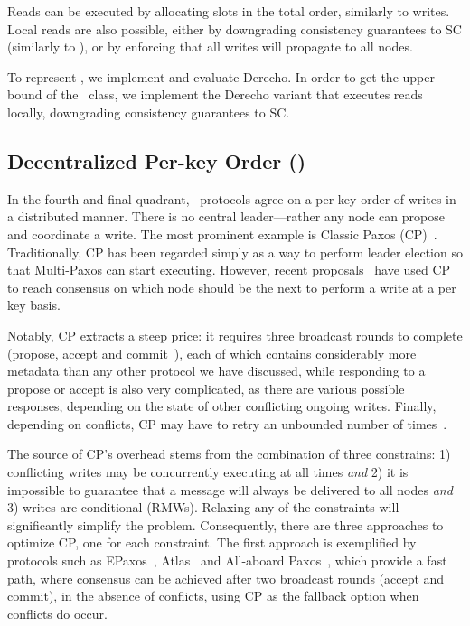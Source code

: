 Reads can be executed 
by allocating slots in the total order, similarly to writes.
Local reads are also possible, either by downgrading consistency guarantees to SC (similarly to \LTO), or by enforcing that all writes will propagate to all nodes.

To represent \DTO, we implement and evaluate Derecho. In order to get the upper bound of the \DTO~class, we implement the Derecho variant that executes reads locally, downgrading consistency guarantees to SC.

\subsection{Decentralized Per-key Order (\DPKO)}\label{sec:tax:dpko}
In the fourth and final quadrant, \DPKO~protocols %
agree on a per-key order of writes in a distributed manner. There is no central leader---rather any node can propose and coordinate a write. 
The most prominent example is Classic Paxos (CP)~\cite{Lamport:1998}.
Traditionally, CP has been regarded simply as a way to perform leader election so that Multi-Paxos can start executing.
However, recent proposals~\cite{Skrzypczak:2020, Rystsov:2018, V:2020}
have used CP to reach consensus on which node should be the next to perform a write at a per key basis.



Notably, CP extracts a steep price: it requires three broadcast rounds to complete (propose, accept and commit~\cite{Howard:2019}), each of which contains considerably more metadata than any other protocol we have discussed, while responding to a propose or accept is also very complicated, as there are various possible responses, depending on the state of other conflicting ongoing writes. Finally, depending on conflicts, CP may have to retry an unbounded number of times~\cite{Fischer:1985}. 

The source of CP's overhead stems from the combination of three constrains:
1) conflicting writes may be concurrently executing at all times \emph{and}
2) it is impossible to guarantee that a message will always be delivered to all nodes \emph{and}
3) writes are conditional (\ie RMWs).
Relaxing any of the constraints will significantly simplify the problem.
Consequently, there are three approaches to optimize CP, one for each constraint.
The first approach is exemplified by protocols such as EPaxos~\cite{Moraru:2013}, Atlas~\cite{Enes:2020} and All-aboard Paxos~\cite{Howard:2019}, which provide a fast path, where consensus can be achieved after two broadcast rounds (accept and commit), 
in the absence of conflicts, 
using CP as the fallback option when conflicts do occur.

